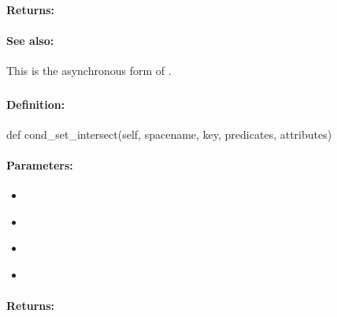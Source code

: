 \paragraph{Returns:}


\paragraph{See also:}  This is the asynchronous form of .

\pagebreak
\subsubsection{}
\label{api:python:cond_set_intersect}


\paragraph{Definition:}
\begin{pythoncode}
def cond_set_intersect(self, spacename, key, predicates, attributes)
\end{pythoncode}

\paragraph{Parameters:}
\begin{itemize}[noitemsep]
\item {}\\

\item {}\\

\item {}\\

\item {}\\

\end{itemize}

\paragraph{Returns:}


